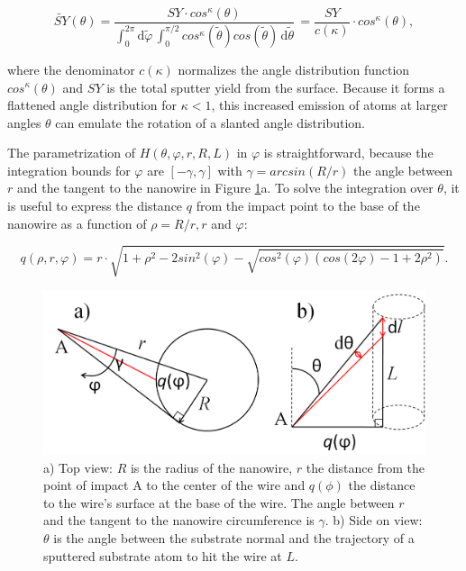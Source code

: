 \begin{equation}
\tilde{SY}(\theta) = \frac{SY \cdot cos^\kappa(\theta)}{\int_0^{2\pi} \! \mathrm{d}\tilde\varphi \,\int_0^{\pi/2} \! cos^\kappa(\tilde\theta) cos(\tilde\theta)\,  \mathrm{d}\tilde\theta} \, = \frac{SY}{c(\kappa)} \cdot cos^\kappa(\theta) ,
\end{equation}

where the denominator $c(\kappa)$ normalizes the angle distribution function $cos^\kappa(\theta)$ and $SY$ is the total sputter yield from the surface. Because it forms a flattened angle distribution for $\kappa < 1$, this increased emission of atoms at larger angles $\theta$ can emulate the rotation of a slanted angle distribution.

The parametrization of $H(\theta,\varphi,r,R,L)$ in $\varphi$ is straightforward, because the integration bounds for $\varphi$ are $[-\gamma, \gamma]$ with $\gamma = arcsin(R/r)$ the angle between $r$ and the tangent to the nanowire in Figure \ref{anglesredepo}a. To solve the integration over $\theta$, it is useful to express the distance $q$ from the impact point to the base of the nanowire as a function of $\rho = R/r, r$ and $\varphi$:

\begin{equation}
q(\rho,r,\varphi) = r\cdot \sqrt{1 + \rho^2 - 2sin^2(\varphi) - \sqrt{cos^2(\varphi)(cos(2\varphi) - 1 + 2\rho^2)}}.
\end{equation}

\begin{figure}
	\centering
		\includegraphics[width=.7\textwidth]{images/anglesredeposition.jpg}
	\caption{a) Top view: $R$ is the radius of the nanowire, $r$ the distance from the point of impact A to the center of the wire and $q(\phi)$ the distance to the wire's surface at the base of the wire. The angle between $r$ and the tangent to the nanowire circumference is $\gamma$. b) Side on view: $\theta$ is the angle between the substrate normal and the trajectory of a sputtered substrate atom to hit the wire at $L$.} 
	\label{anglesredepo}
\end{figure} 

